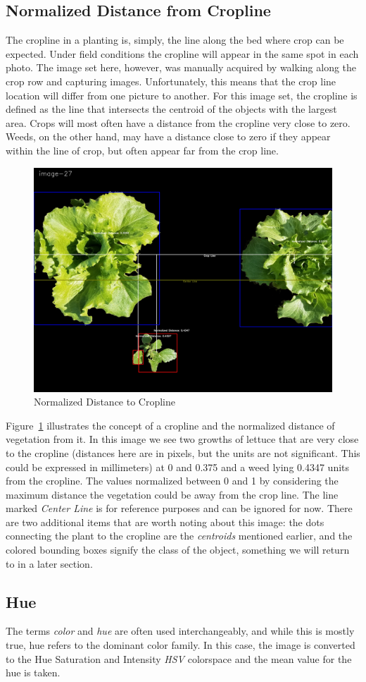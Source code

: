 \documentclass[letterpaper]{article}
\begin{document}
{\subsection{Normalized Distance from Cropline}
The cropline in a planting is, simply, the line along the bed where crop can be expected. Under field conditions the cropline will appear in the same spot in each photo. The image set here, however, was manually acquired by walking along the crop row and capturing images.  Unfortunately, this means that the crop line location will differ from one picture to another. For this image set, the cropline is defined as the line that intersects the centroid of the objects with the largest area. Crops will most often have a distance from the cropline very close to zero. Weeds, on the other hand, may have a distance close to zero if they appear within the line of crop, but often appear far from the crop line.
\begin{figure}[h!]
	\centering
	\includegraphics[width=0.4\linewidth]{./figures/normalized-distance.jpg}
	\caption{Normalized Distance to Cropline}
	\label{fig:normalized-distance}
\end{figure}
Figure~\ref{fig:normalized-distance} illustrates the concept of a cropline and the normalized distance of vegetation from it. In this image we see two growths of lettuce that are very close to the cropline (distances here are in pixels, but the units are not significant. This could be expressed in millimeters) at 0 and 0.375 and a weed lying 0.4347 units from the cropline. The values normalized between 0 and 1 by considering the maximum distance the vegetation could be away from the crop line. The line marked {\it Center Line} is for reference purposes and can be ignored for now.  There are two additional items that are worth noting about this image: the dots connecting the plant to the cropline are the {\it centroids} mentioned earlier, and the colored bounding boxes signify the class of the object, something we will return to in a later section.

\subsection{Hue}
The terms {\it color} and {\it hue} are often used interchangeably, and while this is mostly true, hue refers to the dominant color family. In this case, the image is converted to the Hue Saturation and Intensity {\it HSV} colorspace and the mean value for the hue is taken.

}
\end{document}
